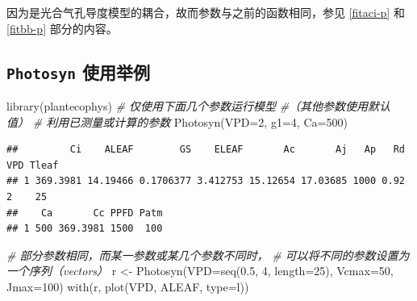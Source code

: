 \documentclass[
]{krantz}
\makeatletter
\newenvironment{Shaded}{\begin{snugshade}}{\end{snugshade}}
\newcommand{\AttributeTok}[1]{\textcolor[rgb]{0.77,0.63,0.00}{#1}}
\newcommand{\CommentTok}[1]{\textcolor[rgb]{0.56,0.35,0.01}{\textit{#1}}}
\newcommand{\DecValTok}[1]{\textcolor[rgb]{0.00,0.00,0.81}{#1}}
\newcommand{\FloatTok}[1]{\textcolor[rgb]{0.00,0.00,0.81}{#1}}
\newcommand{\FunctionTok}[1]{\textcolor[rgb]{0.00,0.00,0.00}{#1}}
\newcommand{\NormalTok}[1]{#1}
\newcommand{\OtherTok}[1]{\textcolor[rgb]{0.56,0.35,0.01}{#1}}
\newcommand{\StringTok}[1]{\textcolor[rgb]{0.31,0.60,0.02}{#1}}
\newenvironment{kframe}{%
\medskip{}
\setlength{\fboxsep}{.8em}
 \def\at@end@of@kframe{}%
 \ifinner\ifhmode%
  \def\at@end@of@kframe{\end{minipage}}%
  \begin{minipage}{\columnwidth}%
 \fi\fi%
 \def\FrameCommand##1{\hskip\@totalleftmargin \hskip-\fboxsep
 \colorbox{shadecolor}{##1}\hskip-\fboxsep
     \hskip-\linewidth \hskip-\@totalleftmargin \hskip\columnwidth}%
 \MakeFramed {\advance\hsize-\width
   \@totalleftmargin\z@ \linewidth\hsize
   \@setminipage}}%
 {\par\unskip\endMakeFramed%
 \at@end@of@kframe}
\renewenvironment{Shaded}{\begin{kframe}}{\end{kframe}}
\makeatother
\begin{document}
因为是光合气孔导度模型的耦合，故而参数与之前的函数相同，参见 \ref{fitaci-p} 和 \ref{fitbb-p} 部分的内容。

\hypertarget{photo_exam}{%
\subsection{\texorpdfstring{\texttt{Photosyn} 使用举例}{Photosyn 使用举例}}\label{photo_exam}}

\begin{Shaded}
\begin{Highlighting}[]
\FunctionTok{library}\NormalTok{(plantecophys)}
\CommentTok{\# 仅使用下面几个参数运行模型}
\CommentTok{\#（其他参数使用默认值）}
\CommentTok{\# 利用已测量或计算的参数}
\FunctionTok{Photosyn}\NormalTok{(}\AttributeTok{VPD=}\DecValTok{2}\NormalTok{, }\AttributeTok{g1=}\DecValTok{4}\NormalTok{, }\AttributeTok{Ca=}\DecValTok{500}\NormalTok{)}
\end{Highlighting}
\end{Shaded}

\begin{verbatim}
##         Ci    ALEAF        GS    ELEAF       Ac       Aj   Ap   Rd VPD Tleaf
## 1 369.3981 14.19466 0.1706377 3.412753 15.12654 17.03685 1000 0.92   2    25
##    Ca       Cc PPFD Patm
## 1 500 369.3981 1500  100
\end{verbatim}

\begin{Shaded}
\begin{Highlighting}[]
\CommentTok{\# 部分参数相同，而某一参数或某几个参数不同时，}
\CommentTok{\# 可以将不同的参数设置为一个序列（vectors）}
\NormalTok{r }\OtherTok{\textless{}{-}} \FunctionTok{Photosyn}\NormalTok{(}\AttributeTok{VPD=}\FunctionTok{seq}\NormalTok{(}\FloatTok{0.5}\NormalTok{, }\DecValTok{4}\NormalTok{, }\AttributeTok{length=}\DecValTok{25}\NormalTok{), }
              \AttributeTok{Vcmax=}\DecValTok{50}\NormalTok{, }\AttributeTok{Jmax=}\DecValTok{100}\NormalTok{)}
\FunctionTok{with}\NormalTok{(r, }\FunctionTok{plot}\NormalTok{(VPD, ALEAF, }\AttributeTok{type=}\StringTok{\textquotesingle{}l\textquotesingle{}}\NormalTok{))}
\end{Highlighting}
\end{Shaded}
\end{document}
